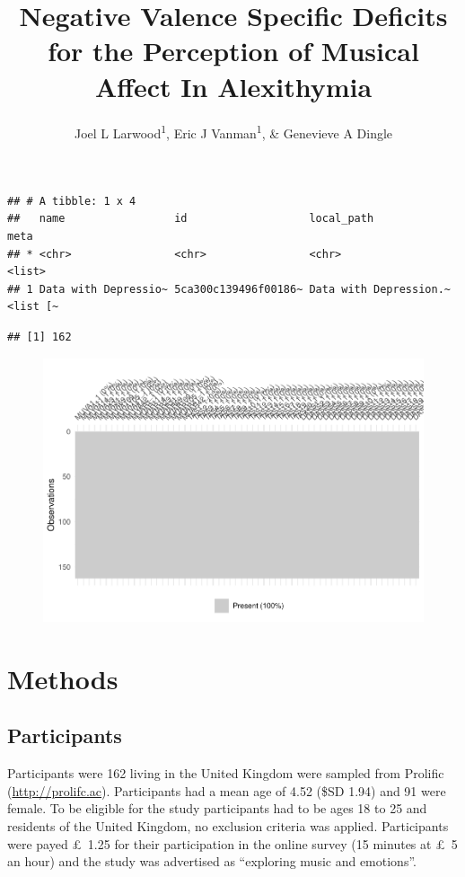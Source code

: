 \documentclass[man]{apa6}
\title{Negative Valence Specific Deficits for the Perception of Musical Affect
In Alexithymia}
\author{Joel L Larwood\textsuperscript{1}, Eric J Vanman\textsuperscript{1}, \&
Genevieve A Dingle}
\date{}
\affiliation{
\vspace{0.5cm}
\textsuperscript{1} School of Psychology, The University of Queensland}
\begin{document}
\maketitle

\begin{verbatim}
## # A tibble: 1 x 4
##   name                 id                   local_path             meta    
## * <chr>                <chr>                <chr>                  <list>  
## 1 Data with Depressio~ 5ca300c139496f00186~ Data with Depression.~ <list [~
\end{verbatim}

\begin{verbatim}
## [1] 162
\end{verbatim}

\begin{figure}
\centering
\includegraphics{Alexithymia_and_Music_Affect_RR1_files/figure-latex/unnamed-chunk-2-1.pdf}
\caption{}
\end{figure}

\section{Methods}\label{methods}

\subsection{Participants}\label{participants}

Participants were 162 living in the United Kingdom were sampled from
Prolific (\url{http://prolifc.ac}). Participants had a mean age of 4.52
(\$SD 1.94) and 91 were female. To be eligible for the study
participants had to be ages 18 to 25 and residents of the United
Kingdom, no exclusion criteria was applied. Participants were payed
\pounds~1.25 for their participation in the online survey (15 minutes at
\pounds~5 an hour) and the study was advertised as \enquote{exploring
music and emotions}.
\end{document}
